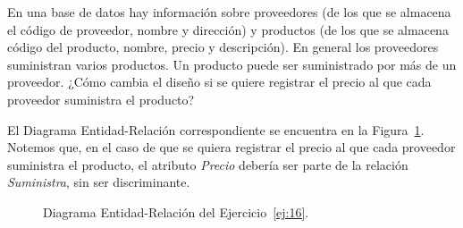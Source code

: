 \begin{ejercicio} \label{ej:16}
    En una base de datos hay información sobre proveedores (de los que se almacena el código de proveedor,
    nombre y dirección) y productos (de los que se almacena código del producto, nombre, precio y descripción).
    En general los proveedores suministran varios productos. Un producto puede ser suministrado por más de un
    proveedor. ¿Cómo cambia el diseño si se quiere registrar el precio al que cada proveedor suministra el
    producto?
    
    El Diagrama Entidad-Relación correspondiente se encuentra en la Figura~\ref{fig:ej16}.
    Notemos que, en el caso de que se quiera registrar el precio al que cada proveedor suministra el producto, el atributo \emph{Precio} debería ser parte de la relación \emph{Suministra}, sin ser discriminante.
    \begin{figure}
        \centering
        \caption{Diagrama Entidad-Relación del Ejercicio~\ref{ej:16}.}
        \label{fig:ej16}
    \end{figure}
\end{ejercicio}


